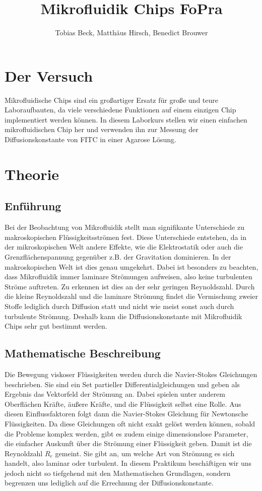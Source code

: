 \documentclass[11pt, a4paper]{article}
\title{Mikrofluidik Chips FoPra}
\author{Tobias Beck, Matthäus Hirsch, Benedict Brouwer}
\begin{document}
\maketitle



\section{Der Versuch}



Mikrofluidische Chips sind ein großartiger Ersatz für große und teure Laboraufbauten, da viele verschiedene Funktionen auf einem einzigen Chip implementiert werden können. In diesem Laborkurs stellen wir einen einfachen mikrofluidischen Chip her und verwenden ihn zur Messung der Diffusionskonstante von FITC in einer Agarose Lösung. 

\section{Theorie}

\subsection{Enführung}

Bei der Beobachtung von Mikrofluidik stellt man signifikante Unterschiede zu makroskopischen Flüssigkeitsströmen fest. Diese Unterschiede entstehen, da in der mikroskopischen Welt andere Effekte, wie die Elektrostatik oder auch die Grenzflächenspannung gegenüber z.B. der Gravitation dominieren. In der makroskopischen Welt ist dies genau umgekehrt. Dabei ist besonders zu beachten, dass Mikrofluidik immer laminare Strömungen aufweisen, also keine turbulenten Ströme auftreten. Zu erkennen ist dies an der sehr geringen Reynoldszahl. Durch die kleine Reynoldszahl und die laminare Strömung findet die Vermischung zweier Stoffe lediglich durch Diffusion statt und nicht wie meist sonst auch durch turbulente Strömung. Deshalb kann die Diffusionskonstante mit  Mikrofluidik Chips sehr gut bestimmt werden.
\subsection{Mathematische Beschreibung}

Die Bewegung viskoser Flüssigkeiten werden durch die Navier-Stokes Gleichungen beschrieben. Sie sind ein Set partieller Differentialgleichungen und geben als Ergebnis das Vektorfeld der Strömung an. Dabei spielen unter anderem Oberflächen Kräfte, äußere Kräfte, und die Flüssigkeit selbst eine Rolle. Aus diesen Einflussfaktoren folgt dann die Navier-Stokes Gleichung für Newtonsche Flüssigkeiten. Da diese Gleichungen oft nicht exakt gelöst werden können, sobald die Probleme komplex werden, gibt es zudem einige dimensionslose Parameter, die einfacher Auskunft über die Strömung einer Flüssigkeit geben. Damit ist die Reynoldzahl $R_{e}$ gemeint. Sie gibt an, um welche Art von Strömung es sich handelt, also laminar oder turbulent. In diesem Praktikum beschäftigen wir uns jedoch nicht so tiefgehend mit den Mathematischen Grundlagen, sondern begrenzen uns lediglich auf die Errechnung der Diffusionskonstante. 
\end{document}
